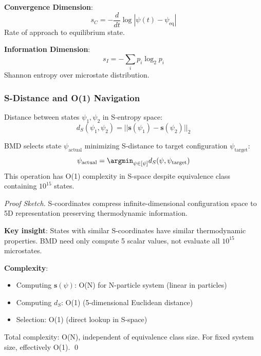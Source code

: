 \documentclass[11pt,onecolumn]{article}
\begin{document}
\textbf{Convergence Dimension}:
\begin{equation}
s_C = -\frac{d}{dt}\log|\psi(t) - \psi_{\text{eq}}|
\end{equation}
Rate of approach to equilibrium state.

\textbf{Information Dimension}:
\begin{equation}
s_I = -\sum_i p_i \log_2 p_i
\end{equation}
Shannon entropy over microstate distribution.

\subsubsection{S-Distance and O(1) Navigation}

\begin{definition}[S-Distance]
Distance between states $\psi_1, \psi_2$ in S-entropy space:
\begin{equation}
d_S(\psi_1, \psi_2) = ||\mathbf{s}(\psi_1) - \mathbf{s}(\psi_2)||_2
\end{equation}
\end{definition}

\begin{theorem}
BMD selects state $\psi_{\text{actual}}$ minimizing S-distance to target configuration $\psi_{\text{target}}$:
\begin{equation}
\psi_{\text{actual}} = \argmin_{\psi \in [\psi]} d_S(\psi, \psi_{\text{target}})
\end{equation}
This operation has O(1) complexity in S-space despite equivalence class containing $10^{15}$ states.
\end{theorem}

\begin{proof}[Proof Sketch]
S-coordinates compress infinite-dimensional configuration space to 5D representation preserving thermodynamic information.

\textbf{Key insight}: States with similar S-coordinates have similar thermodynamic properties. BMD need only compute 5 scalar values, not evaluate all $10^{15}$ microstates.

\textbf{Complexity}:
\begin{itemize}
\item Computing $\mathbf{s}(\psi)$: O(N) for N-particle system (linear in particles)
\item Computing $d_S$: O(1) (5-dimensional Euclidean distance)  
\item Selection: O(1) (direct lookup in S-space)
\end{itemize}

Total complexity: O(N), independent of equivalence class size. For fixed system size, effectively O(1). \qed
\end{proof}
\end{document}
